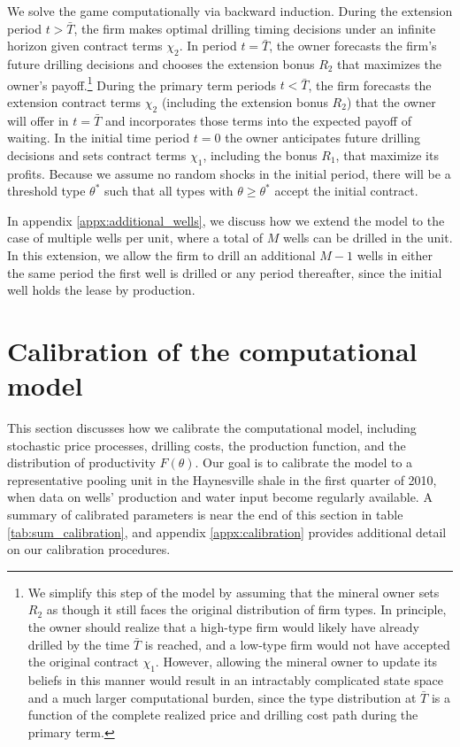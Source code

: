 \documentclass[12pt]{article}
\begin{document}
We solve the game computationally via backward induction. During the extension period $t > \bar{T}$, the firm makes optimal drilling timing decisions under an infinite horizon given contract terms $\chi_2$. In period $t = \bar{T}$, the owner forecasts the firm's future drilling decisions and chooses the extension bonus $R_2$ that maximizes the owner's payoff.\footnote{We simplify this step of the model by assuming that the mineral owner sets $R_2$ as though it still faces the original distribution of firm types. In principle, the owner should realize that a high-type firm would likely have already drilled by the time $\bar{T}$ is reached, and a low-type firm would not have accepted the original contract $\chi_1$. However, allowing the mineral owner to update its beliefs in this manner would result in an intractably complicated state space and a much larger computational burden, since the type distribution at $\bar{T}$ is a function of the complete realized price and drilling cost path during the primary term.} During the primary term periods $t < \bar{T}$, the firm forecasts the extension contract terms $\chi_2$ (including the extension bonus $R_2$) that the owner will offer in $t = \bar{T}$ and incorporates those terms into the expected payoff of waiting. In the initial time period $t=0$ the owner anticipates future drilling decisions and sets contract terms $\chi_1$, including the bonus $R_1$, that maximize its profits. Because we assume no random shocks in the initial period, there will be a threshold type $\theta^*$ such that all types with $\theta \geq \theta^*$ accept the initial contract.

In appendix \ref{appx:additional_wells}, we discuss how we extend the model to the case of multiple wells per unit, where a total of $M$ wells can be drilled in the unit. In this extension, we allow the firm to drill an additional $M-1$ wells in either the same period the first well is drilled or any period thereafter, since the initial well holds the lease by production.




\section{Calibration of the computational model \label{sec:Calibration}}

This section discusses how we calibrate the computational model, including stochastic price processes, drilling costs, the production function, and the distribution of productivity $F(\theta)$. Our goal is to calibrate the model to a representative pooling unit in the Haynesville shale in the first quarter of 2010, when data on wells' production and water input become regularly available. A summary of calibrated parameters is near the end of this section in table \ref{tab:sum_calibration}, and appendix \ref{appx:calibration} provides additional detail on our calibration procedures.
\end{document}

